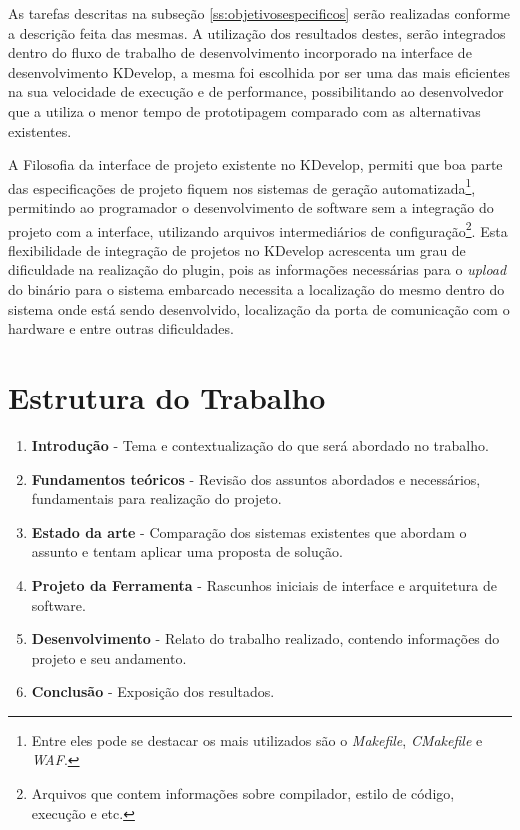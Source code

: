As tarefas descritas na subseção \ref{ss:objetivosespecificos} serão realizadas conforme a descrição feita das mesmas. A utilização dos resultados destes, serão integrados dentro do fluxo de trabalho de desenvolvimento incorporado na interface de desenvolvimento KDevelop, a mesma foi escolhida por ser uma das mais eficientes na sua velocidade de execução e de performance, possibilitando ao desenvolvedor que a utiliza o menor tempo de prototipagem comparado com as alternativas existentes.

A Filosofia da interface de projeto existente no KDevelop, permiti que boa parte das especificações de projeto fiquem nos sistemas de geração automatizada\footnote{Entre eles pode se destacar os mais utilizados são o \textit{Makefile}, \textit{CMakefile} e \textit{WAF}.}, permitindo ao programador o desenvolvimento de software sem a integração do projeto com a interface, utilizando arquivos intermediários de configuração\footnote{Arquivos que contem informações sobre compilador, estilo de código, execução e etc.}. Esta flexibilidade de integração de projetos no KDevelop acrescenta um grau de dificuldade na realização do plugin, pois as informações necessárias para o \textit{upload} do binário para o sistema embarcado necessita a localização do mesmo dentro do sistema onde está sendo desenvolvido, localização da porta de comunicação com o hardware e entre outras dificuldades. 

\section{Estrutura do Trabalho}

\begin{enumerate}
\item \textbf{Introdução} - Tema e contextualização do que será abordado no trabalho.
\item \textbf{Fundamentos teóricos} - Revisão dos assuntos abordados e necessários, fundamentais para realização do projeto.
\item \textbf{Estado da arte} - Comparação dos sistemas existentes que abordam o assunto e tentam aplicar uma proposta de solução.
\item \textbf{Projeto da Ferramenta} - Rascunhos iniciais de interface e arquitetura de software.
\item \textbf{Desenvolvimento} - Relato do trabalho realizado, contendo informações do projeto e seu andamento.
\item \textbf{Conclusão} - Exposição dos resultados.
\end{enumerate}
